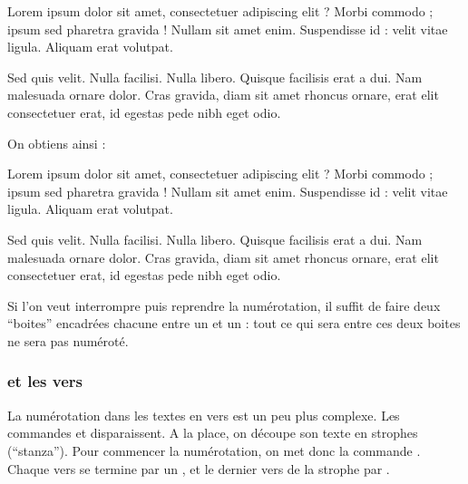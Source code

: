 \begin{latexcode}
\beginnumbering
\pstart %
Lorem ipsum dolor sit amet, consectetuer adipiscing elit ?
Morbi commodo ; ipsum sed pharetra gravida !
Nullam sit amet enim. Suspendisse id : velit vitae ligula.
Aliquam erat volutpat.

Sed quis velit. Nulla facilisi. Nulla libero. 
Quisque facilisis erat a dui. 
Nam malesuada ornare dolor.
Cras gravida, diam sit amet rhoncus ornare, 
erat  elit consectetuer erat, id egestas pede nibh eget odio.
\pend %
\endnumbering
\end{latexcode}

On obtiens ainsi : \bigbreak

\begin{minipage}{10cm}
\beginnumbering
\pstart %
Lorem ipsum dolor sit amet, consectetuer adipiscing elit ?
Morbi commodo ; ipsum sed pharetra gravida !
Nullam sit amet enim. Suspendisse id : velit vitae ligula. 
Aliquam erat volutpat.


Sed quis velit. Nulla facilisi. Nulla libero. 
 Quisque facilisis erat a dui. %
Nam malesuada ornare dolor.
Cras gravida, diam sit amet rhoncus ornare, 
erat  elit consectetuer erat, id egestas pede nibh eget odio.
\pend
\endnumbering
\end{minipage}
\bigbreak


Si l'on veut interrompre puis reprendre la numérotation, il suffit de faire deux \enquote{boites} encadrées chacune entre un   et un :  tout ce qui sera entre ces deux boites ne sera pas numéroté.

\subsubsection{ et les vers}

La  numérotation dans les textes en vers est un peu plus complexe. Les commandes  et  disparaissent. A la place, on découpe son texte en strophes (\enquote{stanza}). Pour commencer la numérotation, on met donc la commande . Chaque vers se termine par un \ampersand , et le dernier vers de la strophe par \cs{\ampersand}.  

